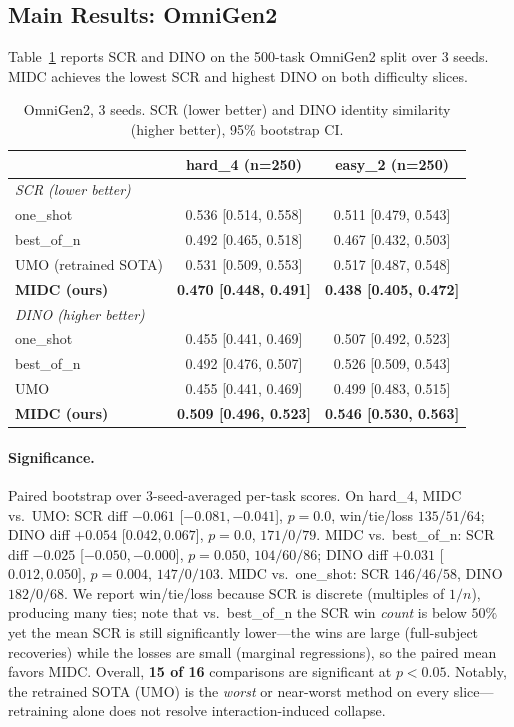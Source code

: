 \documentclass[letterpaper]{article}
\begin{document}
\subsection{Main Results: OmniGen2}
\label{sec:main}

Table~\ref{tab:main} reports SCR and DINO on the 500-task OmniGen2 split over 3 seeds. MIDC achieves the lowest SCR and highest DINO on both difficulty slices.

\begin{table}[ht]
\centering
\small
\caption{OmniGen2, 3 seeds. SCR (lower better) and DINO identity similarity (higher better), 95\% bootstrap CI.}
\label{tab:main}
\begin{tabular}{lcc}
\toprule
& hard\_4 (n=250) & easy\_2 (n=250) \\
\midrule
\multicolumn{3}{l}{\textit{SCR (lower better)}} \\
\midrule
one\_shot & 0.536 [0.514, 0.558] & 0.511 [0.479, 0.543] \\
best\_of\_n & 0.492 [0.465, 0.518] & 0.467 [0.432, 0.503] \\
UMO (retrained SOTA) & 0.531 [0.509, 0.553] & 0.517 [0.487, 0.548] \\
\textbf{MIDC (ours)} & \textbf{0.470 [0.448, 0.491]} & \textbf{0.438 [0.405, 0.472]} \\
\midrule
\multicolumn{3}{l}{\textit{DINO (higher better)}} \\
\midrule
one\_shot & 0.455 [0.441, 0.469] & 0.507 [0.492, 0.523] \\
best\_of\_n & 0.492 [0.476, 0.507] & 0.526 [0.509, 0.543] \\
UMO & 0.455 [0.441, 0.469] & 0.499 [0.483, 0.515] \\
\textbf{MIDC (ours)} & \textbf{0.509 [0.496, 0.523]} & \textbf{0.546 [0.530, 0.563]} \\
\bottomrule
\end{tabular}
\end{table}

\paragraph{Significance.} Paired bootstrap over 3-seed-averaged per-task scores. On hard\_4, MIDC vs.\ UMO: SCR diff $-0.061$ [$-0.081,-0.041$], $p{=}0.0$, win/tie/loss $135/51/64$; DINO diff $+0.054$ [$0.042,0.067$], $p{=}0.0$, $171/0/79$. MIDC vs.\ best\_of\_n: SCR diff $-0.025$ [$-0.050,-0.000$], $p{=}0.050$, $104/60/86$; DINO diff $+0.031$ [$0.012,0.050$], $p{=}0.004$, $147/0/103$. MIDC vs.\ one\_shot: SCR $146/46/58$, DINO $182/0/68$. We report win/tie/loss because SCR is discrete (multiples of $1/n$), producing many ties; note that vs.\ best\_of\_n the SCR win \emph{count} is below $50\%$ yet the mean SCR is still significantly lower---the wins are large (full-subject recoveries) while the losses are small (marginal regressions), so the paired mean favors MIDC. Overall, \textbf{15 of 16} comparisons are significant at $p<0.05$. Notably, the retrained SOTA (UMO) is the \emph{worst} or near-worst method on every slice---retraining alone does not resolve interaction-induced collapse.
\end{document}
